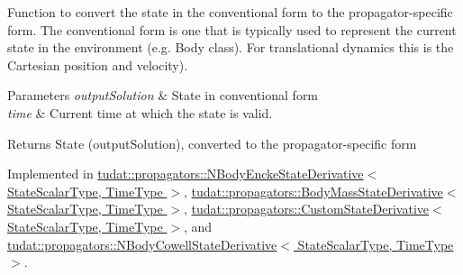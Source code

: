 Function to convert the state in the conventional form to the propagator-\/specific form. The conventional form is one that is typically used to represent the current state in the environment (e.\+g. Body class). For translational dynamics this is the Cartesian position and velocity). 
\begin{DoxyParams}{Parameters}
{\em output\+Solution} & State in \textquotesingle{}conventional form\textquotesingle{} \\
\hline
{\em time} & Current time at which the state is valid. \\
\hline
\end{DoxyParams}
\begin{DoxyReturn}{Returns}
State (output\+Solution), converted to the \textquotesingle{}propagator-\/specific form\textquotesingle{} 
\end{DoxyReturn}


Implemented in \hyperlink{classtudat_1_1propagators_1_1NBodyEnckeStateDerivative_ae452f6473f5d4ec89e7c8b64b6962bd9}{tudat\+::propagators\+::\+N\+Body\+Encke\+State\+Derivative$<$ State\+Scalar\+Type, Time\+Type $>$}, \hyperlink{classtudat_1_1propagators_1_1BodyMassStateDerivative_a02810a56236b1c338f869e00b584b8b1}{tudat\+::propagators\+::\+Body\+Mass\+State\+Derivative$<$ State\+Scalar\+Type, Time\+Type $>$}, \hyperlink{classtudat_1_1propagators_1_1CustomStateDerivative_a6361733845c6c55305f326dbea40f5a1}{tudat\+::propagators\+::\+Custom\+State\+Derivative$<$ State\+Scalar\+Type, Time\+Type $>$}, and \hyperlink{classtudat_1_1propagators_1_1NBodyCowellStateDerivative_ac9b98ba54b33e191adf8c65c170eac57}{tudat\+::propagators\+::\+N\+Body\+Cowell\+State\+Derivative$<$ State\+Scalar\+Type, Time\+Type $>$}.

